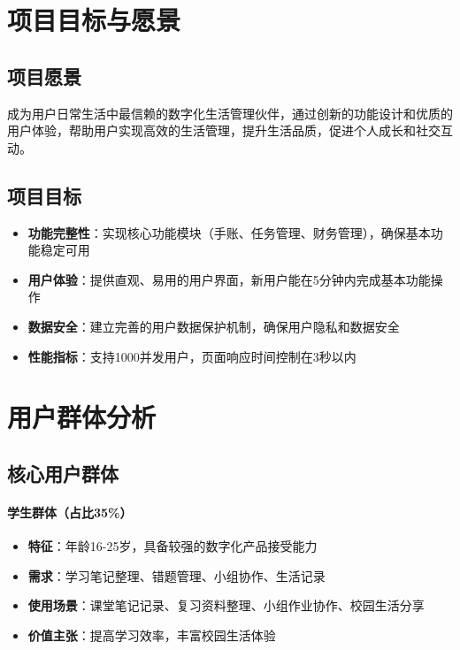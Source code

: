 \documentclass[a4paper]{article}
\begin{document}
\section{项目目标与愿景}

\subsection{项目愿景}

成为用户日常生活中最信赖的数字化生活管理伙伴，通过创新的功能设计和优质的用户体验，帮助用户实现高效的生活管理，提升生活品质，促进个人成长和社交互动。

\subsection{项目目标}

\begin{itemize}
    \item \textbf{功能完整性}：实现核心功能模块（手账、任务管理、财务管理），确保基本功能稳定可用
    \item \textbf{用户体验}：提供直观、易用的用户界面，新用户能在5分钟内完成基本功能操作
    \item \textbf{数据安全}：建立完善的用户数据保护机制，确保用户隐私和数据安全
    \item \textbf{性能指标}：支持1000并发用户，页面响应时间控制在3秒以内
\end{itemize}


\section{用户群体分析}

\subsection{核心用户群体}

\paragraph{学生群体（占比35\%）}
\begin{itemize}
    \item \textbf{特征}：年龄16-25岁，具备较强的数字化产品接受能力
    \item \textbf{需求}：学习笔记整理、错题管理、小组协作、生活记录
    \item \textbf{使用场景}：课堂笔记记录、复习资料整理、小组作业协作、校园生活分享
    \item \textbf{价值主张}：提高学习效率，丰富校园生活体验
\end{itemize}
\end{document}
